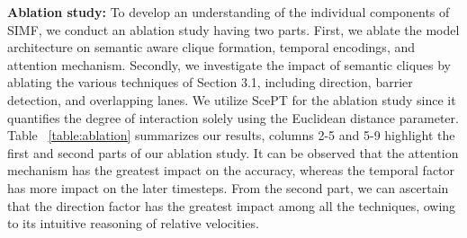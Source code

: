 \documentclass{article}
\begin{document}
\textbf{Ablation study:} 
To develop an understanding of the individual components of SIMF, we conduct an ablation study having two parts. First, we ablate the model architecture on semantic aware clique formation, temporal encodings, and  attention mechanism. Secondly, we investigate the impact of semantic cliques by ablating the various techniques of Section 3.1, including direction, barrier detection, and overlapping lanes. We utilize ScePT for the ablation study since it quantifies the degree of interaction solely using the Euclidean distance parameter. Table ~\ref{table:ablation} summarizes our results, columns 2-5 and 5-9 highlight the first and second parts of our ablation study. It can be observed that the attention mechanism has the greatest impact on the accuracy, whereas the temporal factor has more impact on the later timesteps. From the second part, we can ascertain that the direction factor has the greatest impact among all the techniques, owing to its intuitive reasoning of relative velocities. 


        


                 
\end{document}
